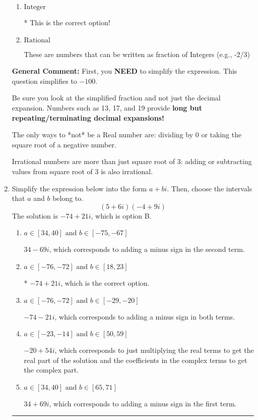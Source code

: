 \documentclass{extbook}[14pt]
\newcommand{\litem}[1]{\item #1

\rule{\textwidth}{0.4pt}}
\begin{document}
\begin{enumerate}
{\begin{enumerate}[label=\Alph*.]
These cannot be written as a fraction of Integers.
\item \( \text{Integer} \)

* This is the correct option!
\item \( \text{Rational} \)

These are numbers that can be written as fraction of Integers (e.g., -2/3)
\end{enumerate}

\textbf{General Comment:} First, you \textbf{NEED} to simplify the expression. This question simplifies to $-100$. 
 
 Be sure you look at the simplified fraction and not just the decimal expansion. Numbers such as 13, 17, and 19 provide \textbf{long but repeating/terminating decimal expansions!} 
 
 The only ways to *not* be a Real number are: dividing by 0 or taking the square root of a negative number. 
 
 Irrational numbers are more than just square root of 3: adding or subtracting values from square root of 3 is also irrational.
}
\litem{
Simplify the expression below into the form $a+bi$. Then, choose the intervals that $a$ and $b$ belong to.
\[ (5 + 6 i)(-4 + 9 i) \]The solution is \( -74 + 21 i \), which is option B.\begin{enumerate}[label=\Alph*.]
\item \( a \in [34, 40] \text{ and } b \in [-75, -67] \)

 $34 - 69 i$, which corresponds to adding a minus sign in the second term.
\item \( a \in [-76, -72] \text{ and } b \in [18, 23] \)

* $-74 + 21 i$, which is the correct option.
\item \( a \in [-76, -72] \text{ and } b \in [-29, -20] \)

 $-74 - 21 i$, which corresponds to adding a minus sign in both terms.
\item \( a \in [-23, -14] \text{ and } b \in [50, 59] \)

 $-20 + 54 i$, which corresponds to just multiplying the real terms to get the real part of the solution and the coefficients in the complex terms to get the complex part.
\item \( a \in [34, 40] \text{ and } b \in [65, 71] \)

 $34 + 69 i$, which corresponds to adding a minus sign in the first term.
\end{enumerate}

}
\end{enumerate}
\end{document}
